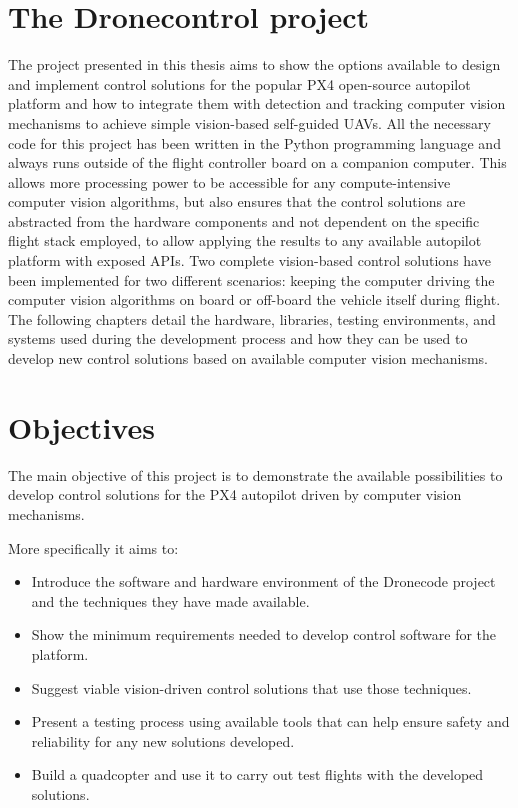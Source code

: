 \section{The Dronecontrol project}

The project presented in this thesis aims to show the options available to design and implement control solutions for the popular PX4 open-source autopilot platform and how to integrate them with detection and tracking computer vision mechanisms to achieve simple vision-based self-guided UAVs.
All the necessary code for this project has been written in the Python programming language and always runs outside of the flight controller board on a companion computer.
This allows more processing power to be accessible for any compute-intensive computer vision algorithms,
but also ensures that the control solutions are abstracted from the hardware components and not dependent on the specific flight stack employed, 
to allow applying the results to any available autopilot platform with exposed APIs.
Two complete vision-based control solutions have been implemented for two different scenarios: keeping the computer driving the computer vision algorithms on board or off-board the vehicle itself during flight.
The following chapters detail the hardware, libraries, testing environments, and systems used during the development process and how they can be used to develop new control solutions based on available computer vision mechanisms.



\section{Objectives}
\label{sec:objetives}

The main objective of this project is to demonstrate the available possibilities to develop control solutions for the PX4 autopilot driven by computer vision mechanisms.

More specifically it aims to:
\begin{itemize}
    \item Introduce the software and hardware environment of the Dronecode project and the techniques they have made available.
    \item Show the minimum requirements needed to develop control software for the platform.
    \item Suggest viable vision-driven control solutions that use those techniques.
    \item Present a testing process using available tools that can help ensure safety and reliability for any new solutions developed.
    \item Build a quadcopter and use it to carry out test flights with the developed solutions.
\end{itemize}


